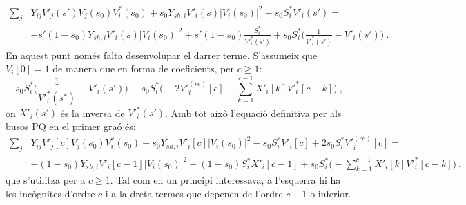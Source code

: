 \begin{equation}
    \begin{split}
    \sum_{j}&Y_{ij}V'_j(s')V_j(s_0)V^*_i(s_0)+s_0Y_{sh,i}V'_i(s)|V_i(s_0)|^2-s_0S^*_iV'_i(s')=\\
    &-s'(1-s_0)Y_{sh,i}V'_i(s)|V_i(s_0)|^2+s'(1-s_0)\frac{S^*_i}{V'^{*}_i(s')}
    +s_0S^*_i\biggl(\frac{1}{V'^{*}_i(s')}-V'_i(s')\biggr)\ .
    \end{split}
        \label{eq:P7}
\end{equation}
En aquest punt només falta desenvolupar el darrer terme. S'assumeix que $V_i[0]=1$ de manera que en forma de coeficients, per $c\geq1$:
\begin{equation}
    s_0S^*_i\biggl(\frac{1}{V'^*_i(s^*)}-V'_i(s')\biggr)\equiv s_0S^*_i\biggl(-2V'^{(re)}_i[c]-\sum_{k=1}^{c-1}X'_i[k]V'^{*}_i[c-k]\biggr)\ ,
        \label{eq:P8}
\end{equation}
on $X'_i(s')$ és la inversa de $V'^*_i(s')$. Amb tot això l'equació definitiva per als busos PQ en el primer graó és:
\begin{equation}
    \begin{split}
    \sum_{j}&Y_{ij}V'_j[c]V_j(s_0)V^*_i(s_0)+s_0Y_{sh,i}V'_i[c]|V_i(s_0)|^2-s_0S^*_iV'_i[c] +2s_0S^*_iV'^{(re)}_i[c]=\\
    &-(1-s_0)Y_{sh,i}V'_i[c-1]|V_i(s_0)|^2+(1-s_0)S^*_iX'_i[c-1]
    +s_0S^*_i\biggl(-\sum_{k=1}^{c-1}X'_i[k]V'^{*}_i[c-k]\biggr)\ ,
    \end{split}
        \label{eq:P9}
\end{equation}
que s'utilitza per a $c\geq 1$. Tal com en un principi interessava, a l'esquerra hi ha les incògnites d'ordre $c$ i a la dreta termes que depenen de l'ordre $c-1$ o inferior. 

